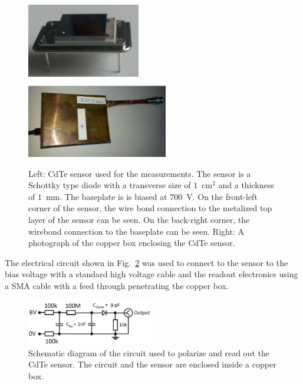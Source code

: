 %
\begin{figure}[htbp] 
\centering
\includegraphics[width=0.44\textwidth]{figures/CdTeSensor.png} 
\includegraphics[width=0.55\textwidth]{figures/CdTeSensorBox.png} 
\caption{Left: CdTe sensor used for the measurements. The sensor is a Schottky type diode with a transverse size 
of $1$~$\mathrm{cm}^{2}$ and a thickness of $1$~mm. The baseplate is is biased at $700$~V. 
On the front-left corner of the sensor, the wire bond connection
to the metalized top layer of the sensor can be seen. On the back-right corner,
the wirebond connection to the baseplate can be seen. 
Right: A photograph of the copper box enclosing the CdTe sensor. } 
\label{fig:CdTeSensor} 
\end{figure} 
%
The electrical circuit shown in Fig.~\ref{fig:cdtecircuit} was used to connect to the sensor to the bias 
voltage with a standard high voltage cable and the readout electronics using a SMA cable with a feed 
through penetrating the copper box.

%
\begin{figure}[htbp] 
\centering
\includegraphics[width=0.49\textwidth]{figures/circuit_CdTe.png} 
\caption{Schematic diagram of the circuit used to polarize and read out the 
CdTe sensor. The circuit and the sensor are enclosed inside a copper box. }
\label{fig:cdtecircuit} 
\end{figure} 
%
